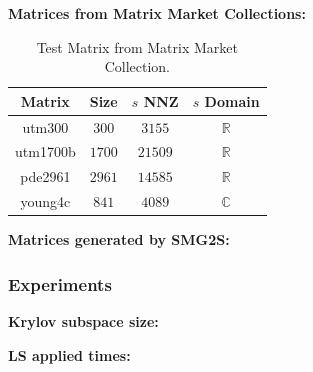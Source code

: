 \textbf{Matrices from Matrix Market Collections: }
\begin{table}[htbp]
	\renewcommand{\arraystretch}{1.4}
	\small	
	\caption{Test Matrix from Matrix Market Collection.}
	\label{testmatrixforparameters}
	\centering
	\begin{tabular}{c|c|c|c}
		\toprule
		Matrix  & Size & $s$ NNZ & $s$ Domain\\
		\midrule
		utm300  & $300$ & $3155$ &$\mathbb{R}$ \\
		utm1700b & $1700$ & $21509$  & $\mathbb{R}$ \\
		pde2961 & $2961$ & $14585$& $\mathbb{R}$ \\
		young4c & $841$ & $4089$& $\mathbb{C}$ \\
		\bottomrule
	\end{tabular}
\end{table}

\textbf{Matrices generated by SMG2S: }

\subsubsection{Experiments}

\textbf{Krylov subspace size: }

\textbf{LS applied times: }

